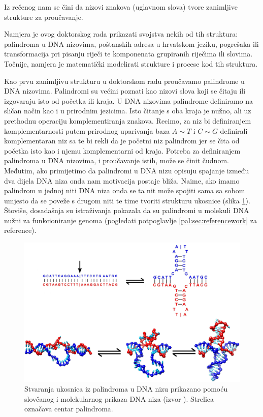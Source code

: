Iz rečenog nam se čini da nizovi znakova (uglavnom slova)
tvore zanimljive strukture za proučavanje.

Namjera je ovog doktorskog rada prikazati svojstva nekih od tih struktura:
palindroma u DNA nizovima, poštanskih adresa u hrvatskom jeziku,
pogrešaka ili transformacija pri pisanju riječi te
komponenata grupiranih riječima ili slovima.
Točnije, namjera je matematički modelirati strukture i
procese kod tih struktura.

Kao prvu zanimljivu strukturu u doktorskom radu proučavamo palindrome
u DNA nizovima. Palindromi su većini poznati kao nizovi slova
koji se čitaju ili izgovaraju isto od početka ili kraja. 
U DNA nizovima palindrome definiramo na sličan način kao i
u prirodnim jezicima.
Isto čitanje s oba kraja je nužno,
ali uz prethodnu operaciju komplementiranja znakova.
Recimo, za niz  bi definiranjem komplementarnosti
putem prirodnog uparivanja baza $A \sim T$ i $C \sim G$ definirali
komplementaran niz sa  te bi rekli da je početni niz
palindrom jer se čita od početka isto kao i njemu komplementarni
od kraja. Potreba za definiranjem palindroma u DNA nizovima,
i proučavanje istih, može se činit čudnom. Međutim, ako 
primijetimo da palindromi u DNA nizu opisuju spajanje između
dva dijela DNA niza onda nam motivacija postaje bliža.
Naime, ako imamo palindrom u jednoj
niti DNA niza onda se ta nit može spojiti sama sa sobom umjesto
da se poveže s drugom niti te time tvoriti strukturu ukosnice
(slika \ref{uvod:fig:ukosnice}).
Štoviše, dosadašnja su istraživanja pokazala da su palindromi
u molekuli DNA nužni za funkcioniranje genoma
(pogledati potpoglavlje
\ref{pal:sec:referencework}
za reference).

\begin{figure}
	\includegraphics{./poglavlja/uvod/slike/PCA290_A.jpg}
	\caption{Stvaranja ukosnica iz palindroma u DNA nizu
		prikazano pomoću slovčanog i molekularnog
		prikaza DNA niza (izvor \cite{dna_cruciforms}).
		Strelica označava centar palindroma.}
		\label{uvod:fig:ukosnice}
\end{figure}

